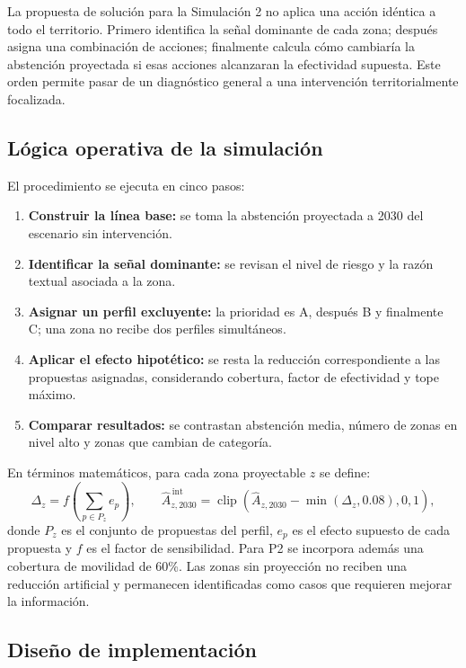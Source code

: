 \documentclass[11pt,a4paper]{article}
\begin{document}
La propuesta de solución para la Simulación 2 no aplica una acción idéntica a todo el territorio. Primero identifica la señal dominante de cada zona; después asigna una combinación de acciones; finalmente calcula cómo cambiaría la abstención proyectada si esas acciones alcanzaran la efectividad supuesta. Este orden permite pasar de un diagnóstico general a una intervención territorialmente focalizada.

\subsection{Lógica operativa de la simulación}

El procedimiento se ejecuta en cinco pasos:
\begin{enumerate}
    \item \textbf{Construir la línea base:} se toma la abstención proyectada a 2030 del escenario sin intervención.
    \item \textbf{Identificar la señal dominante:} se revisan el nivel de riesgo y la razón textual asociada a la zona.
    \item \textbf{Asignar un perfil excluyente:} la prioridad es A, después B y finalmente C; una zona no recibe dos perfiles simultáneos.
    \item \textbf{Aplicar el efecto hipotético:} se resta la reducción correspondiente a las propuestas asignadas, considerando cobertura, factor de efectividad y tope máximo.
    \item \textbf{Comparar resultados:} se contrastan abstención media, número de zonas en nivel alto y zonas que cambian de categoría.
\end{enumerate}

En términos matemáticos, para cada zona proyectable $z$ se define:
\[
\Delta_z=f\left(\sum_{p\in P_z}e_p\right),\qquad
\widehat{A}^{\,\mathrm{int}}_{z,2030}
=\operatorname{clip}\left(\widehat{A}_{z,2030}
-\min(\Delta_z,0.08),0,1\right),
\]
donde $P_z$ es el conjunto de propuestas del perfil, $e_p$ es el efecto supuesto de cada propuesta y $f$ es el factor de sensibilidad. Para P2 se incorpora además una cobertura de movilidad de 60\%. Las zonas sin proyección no reciben una reducción artificial y permanecen identificadas como casos que requieren mejorar la información.

\subsection{Diseño de implementación}
\end{document}
